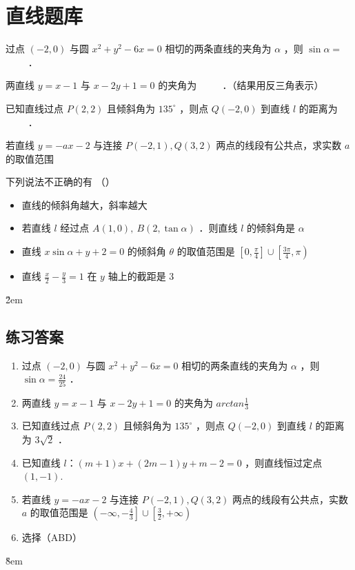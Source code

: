 \section{直线题库}

\begin{problemset}
    \item 过点 $(-2,0)$ 与圆 $x^2+y^2-6 x=0$ 相切的两条直线的夹角为 $\alpha$ ，则 $\sin \alpha=$ \underline{$\qquad$} ．
    \item 两直线 $y=x-1$ 与 $x-2 y+1=0$ 的夹角为 \underline{$\qquad$} ．（结果用反三角表示）
    \item 已知直线过点 $P(2,2)$ 且倾斜角为 $135^{\circ}$ ，则点 $Q(-2,0)$ 到直线 $l$ 的距离为 \underline{$\qquad$} ．
    \item 若直线 $y=-a x-2$ 与连接 $P(-2,1), Q(3,2)$ 两点的线段有公共点，求实数 $a$ 的取值范围
    \item 下列说法不正确的有 （\qquad）
    \begin{itemize}
        \item 直线的倾斜角越大，斜率越大
        \item 若直线 $l$ 经过点 $A(1,0), ~ B(2, \tan \alpha)$ ．则直线 $l$ 的倾斜角是 $\alpha$
        \item 直线 $x \sin \alpha+y+2=0$ 的倾斜角 $\theta$ 的取值范围是 $\left[0, \frac{\pi}{4}\right] \cup\left[\frac{3 \pi}{4}, \pi\right)$
        \item 直线 $\frac{x}{2}-\frac{y}{3}=1$ 在 $y$ 轴上的截距是 3
    \end{itemize}
\end{problemset}

\v{2em}

\subsection{练习答案}
\begin{tips}
    \begin{enumerate}
        \item 过点 $(-2,0)$ 与圆 $x^2+y^2-6 x=0$ 相切的两条直线的夹角为 $\alpha$ ，则 $\sin \alpha= \frac{24}{25}$ ．
        \item 两直线 $y=x-1$ 与 $x-2 y+1=0$ 的夹角为 $arctan\frac{1}{3}$
        \item 已知直线过点 $P(2,2)$ 且倾斜角为 $135^{\circ}$ ，则点 $Q(-2,0)$ 到直线 $l$ 的距离为 $3\sqrt{2}$ ．
        \item 已知直线 $l$：$(m+1) x+(2 m-1) y+m-2=0$ ，则直线恒过定点 \underline{$(1,-1)$}.
        \item 若直线 $y=-a x-2$ 与连接 $P(-2,1), Q(3,2)$ 两点的线段有公共点，实数 $a$ 的取值范围是 $\left(-\infty,-\frac{4}{3}\right] \cup\left[\frac{3}{2},+\infty\right)$
        \item 选择（ABD）
    \end{enumerate}
\end{tips}

\v{8em}